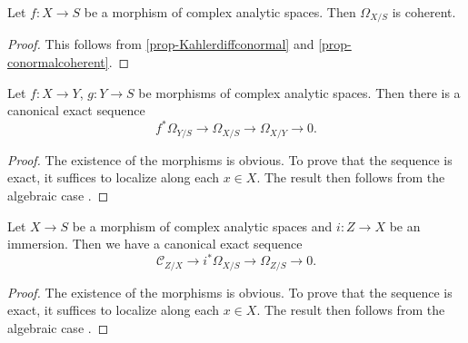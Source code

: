 \begin{corollary}\label{cor-Kahdiffcoh}
    Let $f:X\rightarrow S$ be a morphism of complex analytic spaces.  Then $\Omega_{X/S}$ is coherent.
\end{corollary}
\begin{proof}
    This follows from \cref{prop-Kahlerdiffconormal} and \cref{prop-conormalcoherent}.
\end{proof}

\begin{proposition}\label{prop-Omegafirstseq}
    Let $f:X\rightarrow Y$, $g:Y\rightarrow S$ be morphisms of complex analytic spaces. Then there is a canonical exact sequence
    \[
        f^*\Omega_{Y/S}\rightarrow \Omega_{X/S}\rightarrow \Omega_{X/Y}\rightarrow 0.  
    \]
\end{proposition}
\begin{proof}
    The existence of the morphisms is obvious. To prove that the sequence is exact, it suffices to localize along each $x\in X$. The result then follows from the algebraic case \cite[\href{https://stacks.math.columbia.edu/tag/01UX}{Tag 01UX}]{stacks-project}.
\end{proof}

\begin{proposition}\label{prop-Omegasecondseq}
    Let $X\rightarrow S$ be a morphism of complex analytic spaces and $i:Z\rightarrow X$ be an immersion. Then we have a canonical exact sequence
    \[
        \mathcal{C}_{Z/X}\rightarrow i^*\Omega_{X/S}\rightarrow \Omega_{Z/S}\rightarrow 0.  
    \]
\end{proposition}
\begin{proof}
    The existence of the morphisms is obvious. To prove that the sequence is exact, it suffices to localize along each $x\in X$. The result then follows from the algebraic case \cite[\href{https://stacks.math.columbia.edu/tag/01UZ}{Tag 01UZ}]{stacks-project}.
\end{proof}

